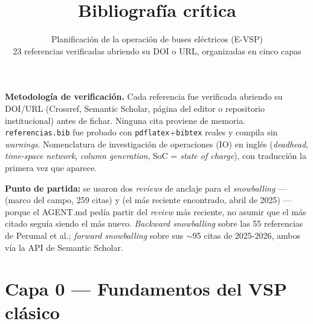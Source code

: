 \documentclass[11pt,a4paper,parskip=half]{scrartcl}
\title{Bibliografía crítica}
\subtitle{\normalsize Planificación de la operación de buses eléctricos (E-VSP)\\[2pt]
23 referencias verificadas abriendo su DOI o URL, organizadas en cinco capas}
\author{}
\date{}
\begin{document}
\maketitle

\begin{nota}
\textbf{\textcolor{ink}{Metodología de verificación.}} Cada referencia fue verificada abriendo su DOI/URL (Crossref, Semantic Scholar, página del editor o repositorio institucional) antes de fichar. Ninguna cita proviene de memoria. \texttt{referencias.bib} fue probado con \texttt{pdflatex}+\texttt{bibtex} reales y compila sin \textit{warnings}. Nomenclatura de investigación de operaciones (IO) en inglés (\textit{deadhead}, \textit{time-space network}, \textit{column generation}, SoC = \textit{state of charge}), con traducción la primera vez que aparece.

\textbf{Punto de partida:} se usaron dos \textit{reviews} de anclaje para el \textit{snowballing} --- \citet{perumal_evspreview_2022} (marco del campo, 259 citas) y \citet{wang_bevretrospective_2025} (el más reciente encontrado, abril de 2025) --- porque el AGENT.md pedía partir del \textit{review} más reciente, no asumir que el más citado seguía siendo el más nuevo. \textit{Backward snowballing} sobre las 55 referencias de Perumal et al.; \textit{forward snowballing} sobre sus $\sim$95 citas de 2025-2026, ambos vía la API de Semantic Scholar.
\end{nota}

\tableofcontents

\section{Capa 0 --- Fundamentos del VSP clásico}
\end{document}
